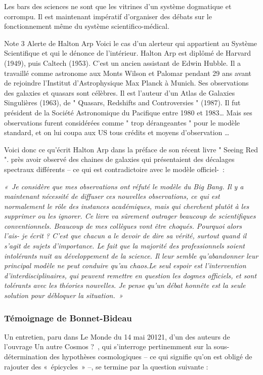 \documentclass[a4paper,12pt]{article}
\begin{document}
 Les bars des sciences ne sont que les vitrines d’un système dogmatique et corrompu.  
Il est maintenant impératif d’organiser des débats sur le fonctionnement même du système scientifico-médical.


Note 3 Alerte de Halton Arp
Voici le cas d’un alerteur qui appartient au Système Scientifique et qui le dénonce de l’intérieur. Halton Arp est diplômé de Harvard (1949), puis Caltech (1953). C’est un ancien assistant de Edwin Hubble. Il a travaillé comme astronome aux Monts Wilson et Palomar pendant 29 ans avant de rejoindre l’Institut d’Astrophysique Max Planck à Munich. Ses observations des galaxies et quasars sont célèbres. Il est l’auteur d’un Atlas de Galaxies Singulières (1963), de " Quasars, Redshifts and Controversies " (1987). Il fut président de la Société Astronomique du Pacifique entre 1980 et 1983… Mais ses observations furent considérées comme " trop dérangeantes " pour le modèle standard, et on lui coupa aux US tous crédits et moyens d’observation … 


Voici donc ce qu’écrit Halton Arp dans la préface de son récent livre " Seeing Red ". près avoir observé des chaines de galaxies qui présentaient des décalages spectraux différents – ce qui est contradictoire avec le modèle officiel- :


\textit{« Je considère que mes observations ont réfuté le modèle du Big Bang. Il y a maintenant nécessité de diffuser ces nouvelles observations, ce qui est normalement le rôle des instances académiques, mais qui cherchent plutôt à les supprimer ou les ignorer. Ce livre va sûrement outrager beaucoup de scientifiques conventionnels. Beaucoup de mes collègues vont être choqués. Pourquoi alors l’ais- je écrit ? C’est que chacun a le devoir de dire sa vérité, surtout quand il s’agit de sujets d’importance. Le fait que la majorité des professionnels soient intolérants nuit au développement de la science. Il leur semble qu’abandonner leur principal modèle ne peut conduire qu’au chaos.Le seul espoir est l’intervention d’interdisciplinaires, qui peuvent remettre en question les dogmes officiels, et sont tolérants avec les théories nouvelles. Je pense qu’un débat honnête est la seule solution pour débloquer la situation. »}


\subsubsection{Témoignage de Bonnet-Bideau}

Un entretien,  paru dans Le Monde du 14 mai 20121, d'un des auteurs de l'ouvrage Un autre Cosmos ? , qui s'interroge pertinemment sur la sous-détermination des hypothèses cosmologiques – ce qui signifie qu'on est obligé de rajouter des « épicycles » –, se termine par la question suivante :
\end{document}
